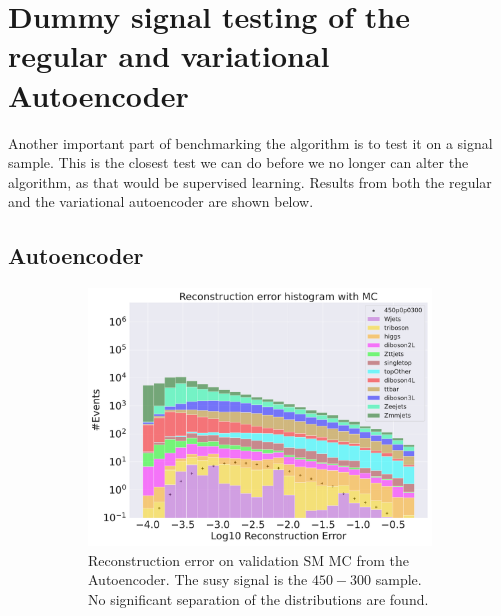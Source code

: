 \section{Dummy signal testing of the regular and variational Autoencoder}

Another important part of benchmarking the algorithm is to test it on a signal sample. This is the closest test we can do before
we no longer can alter the algorithm, as that would be supervised learning. Results from both the regular and the variational autoencoder 
are shown below. 

\subsection*{Autoencoder}

\begin{figure}[h!]
    \centering
    \begin{subfigure}{.8\textwidth}
        \includegraphics[width=\textwidth]{Figures/AE_testing/small/b_data_recon_big_rm3_feats_sig_450p0p0300.pdf}
        \caption{Reconstruction error on validation SM MC from the Autoencoder. The susy signal is the $450-300$ sample. 
        No significant separation of the distributions are found. }
        \label{fig:ae_susy_450_300_recon}
    \end{subfigure}
    \hfill
    \begin{subfigure}{.8\textwidth}

\end{subfigure}
\end{figure}
